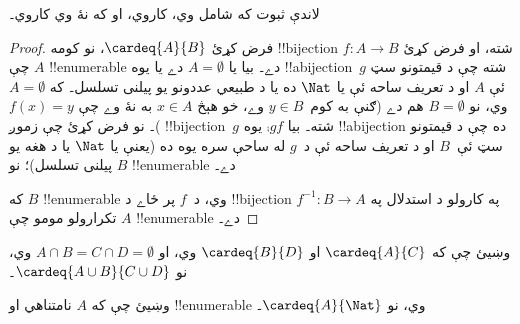 \documentclass[../../../include/open-logic-section]{subfiles}
\begin{document}
\begin{editorial}
لاندې ثبوت که  شامل وي،
 کاروي، او که نۀ وي
 کاروي۔
\end{editorial}

\begin{proof}
فرض کړئ $\cardeq{A}{B}$، نو کومه !!{bijection} $f \colon A
\to B$ شته، او فرض کړئ چې $A$ !!{enumerable} دے۔
{
  بيا يا $A  = \emptyset$ دے يا يوه !!a{bijection}~$g$ شته چې
  د قيمتونو سټ ئې $A$ او د تعريف ساحه ئې يا $\Nat$ ده يا د طبيعي
  عددونو يو پيلنی تسلسل۔ که $A = \emptyset$ وي، نو
  $B = \emptyset$ هم دے (ګنې به کوم~$y \in B$ وے، خو هېڅ
  $x \in A$ به نۀ وے چې $f(x) = y$)۔ نو فرض کړئ چې زموږ
  !!{bijection}~$g$ شته۔ بيا $\comp{g}{f}$ يوه !!a{bijection}
  ده چې د قيمتونو سټ ئې~$B$ او د تعريف ساحه ئې د~$g$ له ساحې
  سره يوه ده (يعنې يا $\Nat$ يا د هغه يو پيلنی تسلسل)؛ نو $B$
  !!{enumerable} دے۔}

که $B$ !!{enumerable} وي، د~$f$ پر ځاے د !!{bijection}
$f^{-1}\colon B \to A$ په کارولو د استدلال په تکرارولو مومو چې
$A$ !!{enumerable} دے۔
\end{proof}

\begin{prob}
وښيئ چې که $\cardeq{A}{C}$ او $\cardeq{B}{D}$ وي، او
$A \cap B = C \cap D = \emptyset$ وي، نو
$\cardeq{A \cup B}{C \cup D}$۔
\end{prob}

\begin{prob}
وښيئ چې که $A$ نامتناهي او !!{enumerable} وي، نو
$\cardeq{A}{\Nat}$۔
\end{prob}
\end{document}
